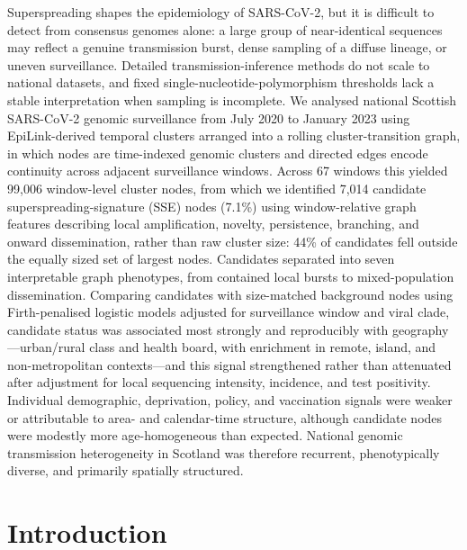\documentclass[10pt,letterpaper]{article}
\begin{document}
Superspreading shapes the epidemiology of SARS-CoV-2, but it is difficult to detect from consensus genomes alone: a large group of near-identical sequences may reflect a genuine transmission burst, dense sampling of a diffuse lineage, or uneven surveillance. Detailed transmission-inference methods do not scale to national datasets, and fixed single-nucleotide-polymorphism thresholds lack a stable interpretation when sampling is incomplete. We analysed national Scottish SARS-CoV-2 genomic surveillance from July 2020 to January 2023 using EpiLink-derived temporal clusters arranged into a rolling cluster-transition graph, in which nodes are time-indexed genomic clusters and directed edges encode continuity across adjacent surveillance windows. Across 67 windows this yielded 99,006 window-level cluster nodes, from which we identified 7,014 candidate superspreading-signature (SSE) nodes (7.1\%) using window-relative graph features describing local amplification, novelty, persistence, branching, and onward dissemination, rather than raw cluster size: 44\% of candidates fell outside the equally sized set of largest nodes. Candidates separated into seven interpretable graph phenotypes, from contained local bursts to mixed-population dissemination. Comparing candidates with size-matched background nodes using Firth-penalised logistic models adjusted for surveillance window and viral clade, candidate status was associated most strongly and reproducibly with geography---urban/rural class and health board, with enrichment in remote, island, and non-metropolitan contexts---and this signal strengthened rather than attenuated after adjustment for local sequencing intensity, incidence, and test positivity. Individual demographic, deprivation, policy, and vaccination signals were weaker or attributable to area- and calendar-time structure, although candidate nodes were modestly more age-homogeneous than expected. National genomic transmission heterogeneity in Scotland was therefore recurrent, phenotypically diverse, and primarily spatially structured.

\linenumbers

\section*{Introduction}
\end{document}

